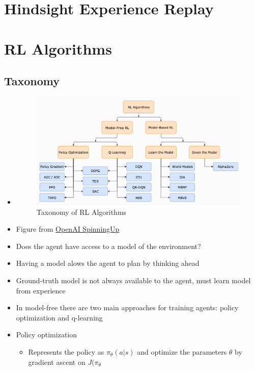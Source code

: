 \documentclass[../main.tex]{subfiles}
\begin{document}
\section{Hindsight Experience Replay}

\section{RL Algorithms}
  \subsection{Taxonomy}
    \begin{itemize}
      \item
      \begin{figure}[h]
        \caption{Taxonomy of RL Algorithms}
        \centering
        \includegraphics[width=\textwidth]{../imgs/rl_taxonomy.png}
      \end{figure}
      \item Figure from \href{https://spinningup.openai.com/en/latest/spinningup/rl_intro2.html}{OpenAI SpinningUp}
      \item Does the agent have access to a model of the environment?
      \item Having a model alows the agent to plan by thinking ahead
      \item Ground-truth model is not always available to the agent, must learn model from experience
      \item In model-free there are two main approaches for training agents: policy optimization and q-learning
      \item Policy optimization
      \begin{itemize}
        \item Represents the policy as $\pi_{\theta}(a|s)$ and optimize the parameters $\theta$ by gradient ascent on $J(\pi_{\theta}$

\end{itemize}
\end{itemize}
\end{document}
